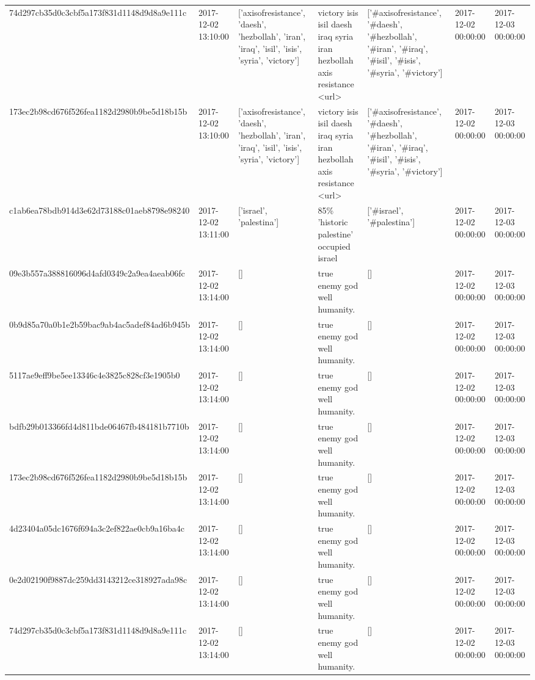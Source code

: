 \begin{tabular}{lllllll}
74d297cb35d0c3cbf5a173f831d1148d9d8a9e111c & 2017-12-02 13:10:00 & ['axisofresistance', 'daesh', 'hezbollah', 'iran', 'iraq', 'isil', 'isis', 'syria', 'victory'] & victory isis isil daesh iraq syria iran hezbollah axis resistance <url> & ['#axisofresistance', '#daesh', '#hezbollah', '#iran', '#iraq', '#isil', '#isis', '#syria', '#victory'] & 2017-12-02 00:00:00 & 2017-12-03 00:00:00 \\
173ec2b98cd676f526fea1182d2980b9be5d18b15b & 2017-12-02 13:10:00 & ['axisofresistance', 'daesh', 'hezbollah', 'iran', 'iraq', 'isil', 'isis', 'syria', 'victory'] & victory isis isil daesh iraq syria iran hezbollah axis resistance <url> & ['#axisofresistance', '#daesh', '#hezbollah', '#iran', '#iraq', '#isil', '#isis', '#syria', '#victory'] & 2017-12-02 00:00:00 & 2017-12-03 00:00:00 \\
c1ab6ea78bdb914d3e62d73188c01aeb8798e98240 & 2017-12-02 13:11:00 & ['israel', 'palestina'] & 85\% 'historic palestine' occupied israel & ['#israel', '#palestina'] & 2017-12-02 00:00:00 & 2017-12-03 00:00:00 \\
09e3b557a388816096d4afd0349c2a9ea4aeab06fc & 2017-12-02 13:14:00 & [] & true enemy god well humanity. & [] & 2017-12-02 00:00:00 & 2017-12-03 00:00:00 \\
0b9d85a70a0b1e2b59bac9ab4ac5adef84ad6b945b & 2017-12-02 13:14:00 & [] & true enemy god well humanity. & [] & 2017-12-02 00:00:00 & 2017-12-03 00:00:00 \\
5117ae9eff9be5ee13346c4e3825c828cf3e1905b0 & 2017-12-02 13:14:00 & [] & true enemy god well humanity. & [] & 2017-12-02 00:00:00 & 2017-12-03 00:00:00 \\
bdfb29b013366fd4d811bde06467fb484181b7710b & 2017-12-02 13:14:00 & [] & true enemy god well humanity. & [] & 2017-12-02 00:00:00 & 2017-12-03 00:00:00 \\
173ec2b98cd676f526fea1182d2980b9be5d18b15b & 2017-12-02 13:14:00 & [] & true enemy god well humanity. & [] & 2017-12-02 00:00:00 & 2017-12-03 00:00:00 \\
4d23404a05dc1676f694a3c2ef822ae0cb9a16ba4c & 2017-12-02 13:14:00 & [] & true enemy god well humanity. & [] & 2017-12-02 00:00:00 & 2017-12-03 00:00:00 \\
0e2d02190f9887dc259dd3143212ce318927ada98c & 2017-12-02 13:14:00 & [] & true enemy god well humanity. & [] & 2017-12-02 00:00:00 & 2017-12-03 00:00:00 \\
74d297cb35d0c3cbf5a173f831d1148d9d8a9e111c & 2017-12-02 13:14:00 & [] & true enemy god well humanity. & [] & 2017-12-02 00:00:00 & 2017-12-03 00:00:00 \\

\end{tabular}
